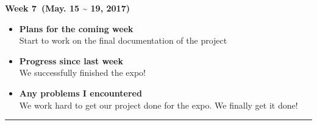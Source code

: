 	\begin{center}
		\textbf{Week 7 (May. 15 {\textasciitilde{}} 19, 2017)}
	\end{center}
	\begin{itemize}
		\item \textbf{Plans for the coming week}
		\\Start to work on the final documentation of the project \\

		\item \textbf{Progress since last week}
		\\We successfully finished the expo!\\

		\item \textbf{Any problems I encountered}
		\\We work hard to get our project done for the expo. We finally get it done!\\
	\end{itemize}

	\rule{\textwidth}{0.5pt}


